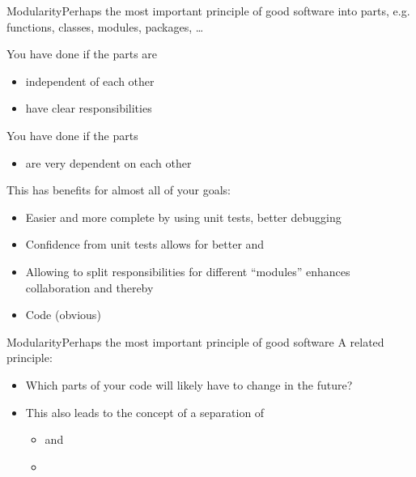 \begin{frame}{Modularity}{Perhaps the most important principle of good software}
	 into parts, e.g. functions, classes, modules, packages, \dots
	
	\bigskip
	You have done  if the parts are 
	\begin{itemize}
		\item independent of each other
		\item have clear responsibilities
	\end{itemize}

	You have done  if the parts
	\begin{itemize}
		\item are very dependent on each other 
	\end{itemize}

	\bigskip
	This has benefits for almost all of your goals:
	\begin{itemize}
		\item Easier and more complete  by using unit tests, better debugging
		\item Confidence from unit tests allows for better  and 
		\item Allowing to split responsibilities for different \enquote{modules} enhances collaboration and thereby 
		\item Code  (obvious)
	\end{itemize}
	
	
\end{frame}

\begin{frame}{Modularity}{Perhaps the most important principle of good software}
	A related principle: 
	
	\begin{itemize}
		\item Which parts of your code will likely have to change in the future?\\
		 \item This also leads to the concept of a separation of 
		 \begin{itemize}
		 	\item {}  and
		 	\item {} 
		 \end{itemize}
	\end{itemize}
\end{frame}

